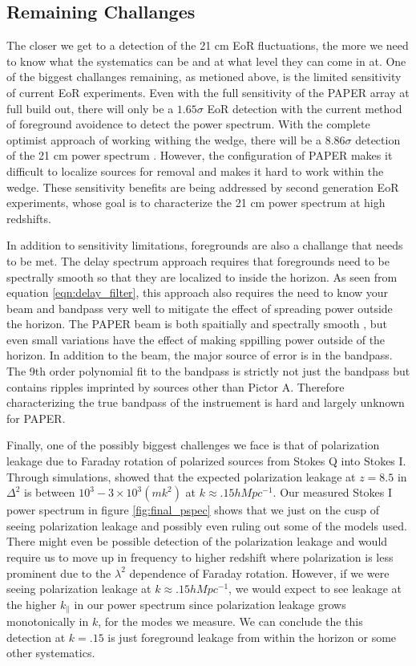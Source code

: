 \documentclass[twocolumn,numberedappendix]{emulateapj} \shorttitle{PSA64}
\begin{document}
\subsection{Remaining Challanges}
The closer we get to a detection of the 21 cm EoR fluctuations, the more we need
to know what the systematics can be and at what level they can come in at. One
of the biggest challanges remaining, as metioned above, is the limited
sensitivity of current EoR experiments. Even with the full sensitivity of the
PAPER array at full build out, there will only be a $1.65\sigma$ EoR detection
with the current method of foreground avoidence to detect the power spectrum.
With the complete optimist approach of working withing the wedge, there will be
a $8.86\sigma$ detection of the 21 cm power spectrum \citep{pober_et_al2014}.
However, the configuration of PAPER makes it difficult to localize sources for
removal and makes it hard to work within the wedge. These sensitivity benefits
are being addressed by second generation EoR experiments, whose goal is to
characterize the 21 cm power spectrum at high redshifts.

In addition to sensitivity limitations, foregrounds are also a challange that
needs to be met. The delay spectrum approach requires that foregrounds need to
be spectrally smooth so that they are localized to inside the horizon. As seen
from equation \ref{eqn:delay_filter}, this approach also requires the need to
know your beam and bandpass very well to mitigate the effect of spreading power
outside the horizon. The PAPER beam is both spaitially and spectrally smooth
\cite{pober_et_al2011}, but even small variations have the effect of
making sppilling power outside of the horizon. In addition to the beam, the
major source of error is in the bandpass. The 9th order polynomial fit to the
bandpass is strictly not just the bandpass but contains ripples imprinted by
sources other than Pictor A. Therefore characterizing the true bandpass of the
instruement is hard and largely unknown for PAPER.

Finally, one of the possibly biggest challenges we face is that of polarization
leakage due to Faraday rotation of polarized sources from Stokes Q into Stokes
I. Through simulations, \cite{moore_et_al2013} showed that the expected
polarization leakage at $z=8.5$ in $\Delta^{2}$ is between
$10^{3}-3\times10^{3} (mk^{2})$ at $k\approx{.15}hMpc^{-1}$. Our measured Stokes
I power spectrum in figure \ref{fig:final_pspec} shows that we just on the cusp
of seeing polarization leakage and possibly even ruling out some of the models
used. There might even be possible detection of the polarization leakage and
would require us to move up in frequency to higher redshift where polarization
is less prominent due to the $\lambda^{2}$ dependence of Faraday rotation.
However, if we were seeing polarization leakage at $k\approx{.15}hMpc^{-1}$, we
would expect to see leakage at the higher $k_{\parallel}$ in our power spectrum
since polarization leakage grows monotonically in $k$, for the modes we measure.
We can conclude the this detection at $k=.15$ is just foreground leakage from
within the horizon or some other systematics.
\end{document}
